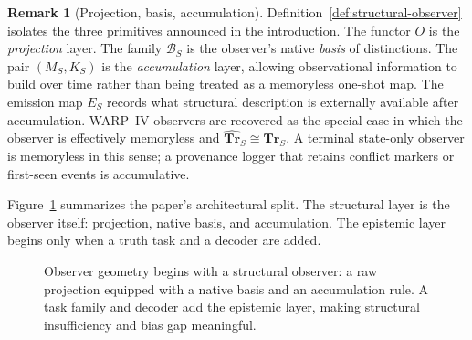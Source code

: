 \documentclass[11pt,twoside]{article}
\theoremstyle{definition}
\newtheorem{remark}[theorem]{Remark}
\newcommand{\Tr}{\mathbf{Tr}}
\newcommand{\Enc}{\mathrm{Enc}}
\begin{document}
\begin{remark}[Projection, basis, accumulation]
\label{rem:projection-basis-accumulation}
Definition~\ref{def:structural-observer} isolates the three primitives announced in the introduction. The functor \(O\) is the \emph{projection} layer. The family \(\mathcal{B}_S\) is the observer's native \emph{basis} of distinctions. The pair \((M_S,K_S)\) is the \emph{accumulation} layer, allowing observational information to build over time rather than being treated as a memoryless one-shot map. The emission map \(E_S\) records what structural description is externally available after accumulation. WARP~IV observers are recovered as the special case in which the observer is effectively memoryless and \(\widehat{\Tr}_S \cong \Tr_S\). A terminal state-only observer is memoryless in this sense; a provenance logger that retains conflict markers or first-seen events is accumulative.
\end{remark}

\noindent Figure~\ref{fig:observer-stack} summarizes the paper's architectural split. The structural layer is the observer itself: projection, native basis, and accumulation. The epistemic layer begins only when a truth task and a decoder are added.

\begin{figure}[t]
\centering
{}
\caption{Observer geometry begins with a structural observer: a raw projection equipped with a native basis and an accumulation rule. A task family and decoder add the epistemic layer, making structural insufficiency and bias gap meaningful.}
\label{fig:observer-stack}
\end{figure}
\end{document}
